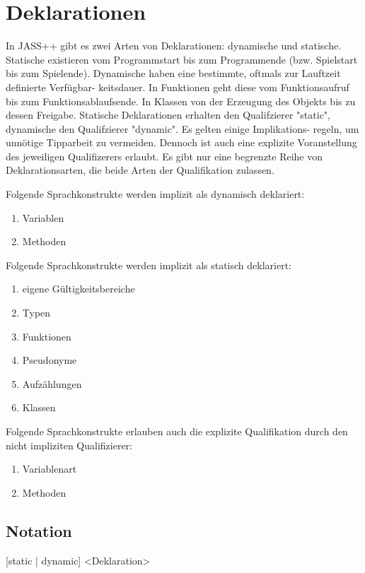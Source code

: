 \chapter{Deklarationen}

In JASS++ gibt es zwei Arten von Deklarationen: dynamische und statische. Statische existieren vom Programmstart bis zum
Programmende (bzw. Spielstart bis zum Spielende). Dynamische haben eine bestimmte, oftmals zur Lauftzeit definierte Verfügbar-
keitsdauer.
In Funktionen geht diese vom Funktionsaufruf bis zum Funktionsablaufsende. In Klassen von der Erzeugung des Objekts bis zu
dessen Freigabe.
Statische Deklarationen erhalten den Qualifzierer "static", dynamische den Qualifzierer "dynamic". Es gelten einige Implikations-
regeln, um unnötige Tipparbeit zu vermeiden. Dennoch ist auch eine explizite Voranstellung des jeweiligen Qualifizerers erlaubt.
Es gibt nur eine begrenzte Reihe von Deklarationsarten, die beide Arten der Qualifikation zulassen.

Folgende Sprachkonstrukte werden implizit als dynamisch deklariert:
\begin{enumerate}
\item Variablen
\item Methoden
\end{enumerate}

Folgende Sprachkonstrukte werden implizit als statisch deklariert:
\begin{enumerate}
\item eigene Gültigkeitsbereiche
\item Typen
\item Funktionen
\item Pseudonyme
\item Aufzählungen
\item Klassen
\end{enumerate}

Folgende Sprachkonstrukte erlauben auch die explizite Qualifikation durch den nicht impliziten Qualifizierer:
\begin{enumerate}
\item Variablenart
\item Methoden
\end{enumerate}

\section{Notation}
[static | dynamic] <Deklaration>
